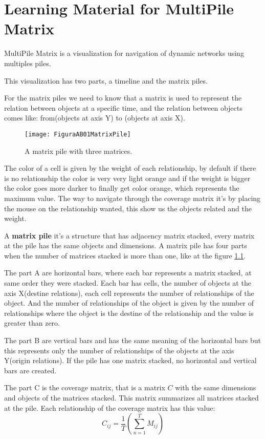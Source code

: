 \chapter{Learning Material for MultiPile Matrix}
\label{MaterialMM}

MultiPile Matrix is a visualization for navigation of dynamic networks using multiples piles.

This visualization has two parts, a timeline and the matrix piles.

For the matrix piles we need to know that a matrix is used to represent the relation between objects at a specific time, and the relation between objects comes like: from(objects at axis Y) to (objects at axis X). 

\begin{figure}[h]
    \centering
    \texttt{[image: FiguraAB01MatrixPile]}
    \caption{A matrix pile with three matrices.}
    \label{fig:MatrixPile}
\end{figure}

The color of a cell is given by the weight of each relationship, by default if there is no relationship the color is very very light orange and if the weight is bigger the color goes more darker to finally get color orange, which represents the maximum value. The way to navigate through the coverage matrix it's by placing the mouse on the relationship wanted, this show us the objects related and the weight.

A \textbf{matrix pile} it's a structure that has adjacency matrix stacked, every matrix at the pile has the same objects and dimensions. A matrix pile has four parts when the number of matrices stacked is more than one, like at the figure \ref{fig:MatrixPile}.


The part A are horizontal bars, where each bar represents a matrix stacked, at same order they were stacked. Each bar has cells, the number of objects at the axis X(destine relations), each cell represents the number of relationships of the object. And the number of relationships of the object is given by the number of relationships where the object is the destine of the relationship and the value is greater than zero.

The part B are vertical bars and has the same meaning of the horizontal bars but this represents only the number of relationships of the objects at the axis Y(origin relations).
If the pile has one matrix stacked, no horizontal and vertical bars are created.

The part C is the coverage matrix, that is a matrix $C$ with the same dimensions and objects of the matrices stacked. This matrix summarizes all matrices stacked at the pile. Each relationship of the coverage matrix has this value: \[C_{ij} = \frac{1}{T} \left(\sum_{n=1}^{T}M_{ij}\right)\]

